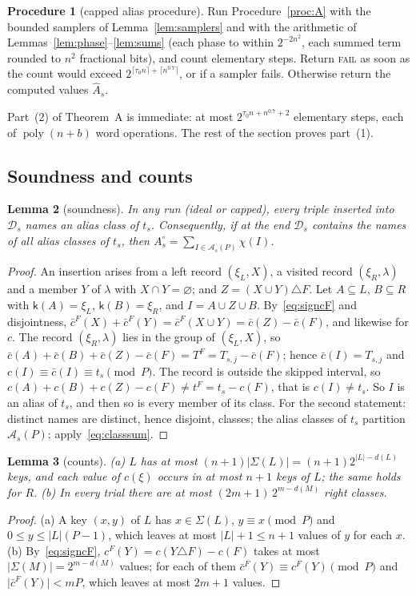 \documentclass[11pt]{article}
\newtheorem{lemma}{Lemma}[section]
\theoremstyle{definition}
\newtheorem{procedure}[lemma]{Procedure}
\newcommand{\bc}{\bar c}
\newcommand{\abs}[1]{\lvert #1\rvert}
\newcommand{\ceil}[1]{\lceil #1\rceil}
\newcommand{\poly}{\operatorname{poly}}
\newcommand{\cA}{\mathcal A}
\newcommand{\cD}{\mathcal D}
\newcommand{\key}{\mathsf k}
\begin{document}
\begin{procedure}[capped alias procedure]\label{proc:Acap}
Run Procedure~\ref{proc:A} with the bounded samplers of Lemma~\ref{lem:samplers} and with the arithmetic of
Lemmas~\ref{lem:phase}--\ref{lem:sums} (each phase to within $2^{-2n^2}$, each summed term rounded to $n^2$
fractional bits), and count elementary steps. Return \textsc{fail} as soon as the count would exceed
$2^{\ceil{\tau_0n}+\ceil{n^{0.7}}}$, or if a sampler fails. Otherwise return the computed values $\hat A_s$.
\end{procedure}
Part~(2) of Theorem~A is immediate: at most $2^{\tau_0n+n^{0.7}+2}$ elementary steps, each of
$\poly(n+b)$ word operations. The rest of the section proves part~(1).

\subsection{Soundness and counts}
\begin{lemma}[soundness]\label{lem:A1}
In any run (ideal or capped), every triple inserted into $\cD_s$ names an alias class of $t_s$. Consequently, if at
the end $\cD_s$ contains the names of all alias classes of $t_s$, then $A^\circ_s=\sum_{I\in\cA_s(P)}\chi(I)$.
\end{lemma}
\begin{proof}
An insertion arises from a left record $(\xi_L,X)$, a visited record $(\xi_R,\lambda)$ and a member $Y$ of $\lambda$
with $X\cap Y=\varnothing$; and $Z=(X\cup Y)\triangle F$. Let $A\subseteq L$, $B\subseteq R$ with $\key(A)=\xi_L$,
$\key(B)=\xi_R$, and $I=A\cup Z\cup B$. By~\eqref{eq:signcF} and disjointness,
$\bc^F(X)+\bc^F(Y)=\bc^F(X\cup Y)=\bc(Z)-\bc(F)$, and likewise for $c$. The record $(\xi_R,\lambda)$ lies in the group
of $(\xi_L,X)$, so $\bc(A)+\bc(B)+\bc(Z)-\bc(F)=T^F=T_{s,j}-\bc(F)$; hence $\bc(I)=T_{s,j}$ and
$c(I)\equiv\bc(I)\equiv t_s\pmod P$. The record is outside the skipped interval, so
$c(A)+c(B)+c(Z)-c(F)\ne t^F=t_s-c(F)$, that is $c(I)\ne t_s$. So $I$ is an alias of $t_s$, and then so is every
member of its class. For the second statement: distinct names are distinct, hence disjoint, classes; the alias
classes of $t_s$ partition $\cA_s(P)$; apply~\eqref{eq:classsum}.
\end{proof}

\begin{lemma}[counts]\label{lem:A2}
\textup{(a)} $L$ has at most $(n+1)\abs{\Sigma(L)}=(n+1)2^{\abs L-d(L)}$ keys, and each value of $c(\xi)$ occurs in
at most $n+1$ keys of $L$; the same holds for $R$. \textup{(b)} In every trial there are at most
$(2m+1)\,2^{m-d(M)}$ right classes.
\end{lemma}
\begin{proof}
(a) A key $(x,y)$ of $L$ has $x\in\Sigma(L)$, $y\equiv x\pmod P$ and $0\le y\le\abs L(P-1)$, which leaves at most
$\abs L+1\le n+1$ values of $y$ for each $x$. (b) By~\eqref{eq:signcF}, $c^F(Y)=c(Y\triangle F)-c(F)$ takes at most
$\abs{\Sigma(M)}=2^{m-d(M)}$ values; for each of them $\bc^F(Y)\equiv c^F(Y)\pmod P$ and $\abs{\bc^F(Y)}<mP$, which
leaves at most $2m+1$ values.
\end{proof}
\end{document}
